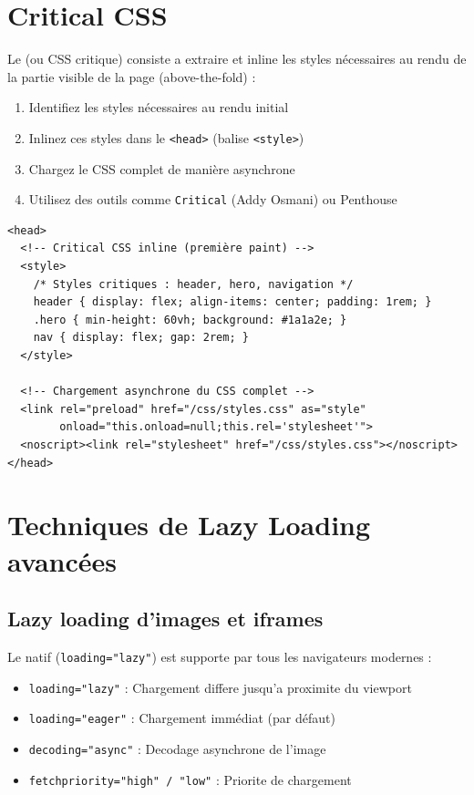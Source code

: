 \section{Critical CSS}

Le  (ou CSS critique) consiste a extraire et inline les styles nécessaires au rendu de la partie visible de la page (above-the-fold) :

\begin{enumerate}
    \item Identifiez les styles nécessaires au rendu initial
    \item Inlinez ces styles dans le \texttt{<head>} (balise \texttt{<style>})
    \item Chargez le CSS complet de manière asynchrone
    \item Utilisez des outils comme \texttt{Critical} (Addy Osmani) ou Penthouse
\end{enumerate}

\begin{lstlisting}[style=htmlcode,caption={Critical CSS inline + chargement asynchrone}]
<head>
  <!-- Critical CSS inline (première paint) -->
  <style>
    /* Styles critiques : header, hero, navigation */
    header { display: flex; align-items: center; padding: 1rem; }
    .hero { min-height: 60vh; background: #1a1a2e; }
    nav { display: flex; gap: 2rem; }
  </style>

  <!-- Chargement asynchrone du CSS complet -->
  <link rel="preload" href="/css/styles.css" as="style"
        onload="this.onload=null;this.rel='stylesheet'">
  <noscript><link rel="stylesheet" href="/css/styles.css"></noscript>
</head>
\end{lstlisting}


\section{Techniques de Lazy Loading avancées}

\subsection{Lazy loading d'images et iframes}

Le  natif (\texttt{loading="lazy"}) est supporte par tous les navigateurs modernes :

\begin{itemize}
    \item \texttt{loading="lazy"} : Chargement differe jusqu'a proximite du viewport
    \item \texttt{loading="eager"} : Chargement immédiat (par défaut)
    \item \texttt{decoding="async"} : Decodage asynchrone de l'image
    \item \texttt{fetchpriority="high" / "low"} : Priorite de chargement
\end{itemize}

